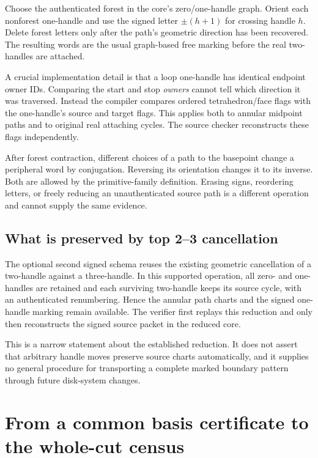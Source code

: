 \documentclass[11pt,a4paper]{article}
\theoremstyle{definition}
\theoremstyle{remark}
\begin{document}
Choose the authenticated forest in the core's zero/one-handle graph. Orient
each nonforest one-handle and use the signed letter $\pm(h+1)$ for crossing
handle $h$. Delete forest letters only after the path's geometric direction
has been recovered. The resulting words are the usual graph-based free
marking before the real two-handles are attached.

A crucial implementation detail is that a loop one-handle has identical
endpoint owner IDs. Comparing the start and stop \emph{owners} cannot tell
which direction it was traversed. Instead the compiler compares ordered
tetrahedron/face flags with the one-handle's source and target flags. This
applies both to annular midpoint paths and to original real attaching
cycles. The source checker reconstructs these flags independently.

After forest contraction, different choices of a path to the basepoint
change a peripheral word by conjugation. Reversing its orientation changes
it to its inverse. Both are allowed by the primitive-family definition.
Erasing signs, reordering letters, or freely reducing an unauthenticated
source path is a different operation and cannot supply the same evidence.

\subsection{What is preserved by top 2--3 cancellation}

The optional second signed schema reuses the existing geometric cancellation
of a two-handle against a three-handle. In this supported operation, all
zero- and one-handles are retained and each surviving two-handle keeps its
source cycle, with an authenticated renumbering. Hence the annular path
charts and the signed one-handle marking remain available. The verifier
first replays this reduction and only then reconstructs the signed source
packet in the reduced core.

This is a narrow statement about the established reduction. It does not
assert that arbitrary handle moves preserve source charts automatically,
and it supplies no general procedure for transporting a complete marked
boundary pattern through future disk-system changes.



\section{From a common basis certificate to the whole-cut census}
\label{sec:gluing}
\end{document}
